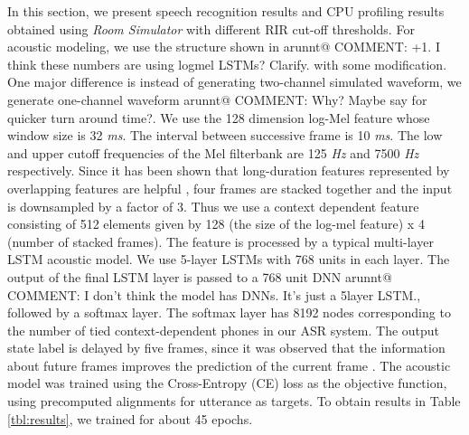 \documentclass{article}
\makeatletter
\newcommand{\AR}[1]{{\color{red} arunnt@ COMMENT: #1}}
\makeatother
\begin{document}
In this section, we present speech recognition results and CPU profiling
results obtained using \textit{Room Simulator} with different RIR cut-off
thresholds. For acoustic modeling, we use the structure shown in
\AR{+1. I think these numbers are using logmel LSTMs? Clarify.}
\cite{B_Li_INTERSPEECH_2017_1}
%
with some modification.
One major difference is instead of generating two-channel simulated
waveform, we generate one-channel waveform \AR{Why? Maybe say for quicker turn around time?}.
We use the 128 dimension log-Mel feature whose window
size is 32 \textit{ms}. The interval between successive frame is 10
\textit{ms}. The low and upper cutoff frequencies of the Mel filterbank
are 125 \textit{Hz} and 7500 \textit{Hz} respectively.
Since it has been shown that long-duration features represented by overlapping
features are helpful \cite{H_Sak_INTERSPEECH_2015_1}, four frames
are stacked together and the input is downsampled by a factor of 3.
Thus we use a context dependent feature consisting of 512 elements
given by 128 (the size of the log-mel feature) x 4 (number of stacked frames).
The feature is processed by a typical multi-layer LSTM acoustic model.
We use 5-layer LSTMs with 768 units in each layer.
The output of the final LSTM layer is passed to a 768
unit DNN \AR{I don't think the model has DNNs. It's just a 5layer LSTM.}, followed by a softmax layer.
The softmax layer has 8192 nodes corresponding to the number of tied
context-dependent phones in our ASR system. The output state label is delayed
by five frames, since it was observed that
the information about future frames improves the prediction of the current frame
  \cite{H_Sak_INTERSPEECH_2014_1, M_Schuster_ieee_trans_signal_processing_1997}.
%
The acoustic model was trained using the Cross-Entropy (CE) loss
as the objective function, using precomputed alignments for utterance as targets.
To obtain results in Table \ref{tbl:results}, we trained for about 45 epochs.
\end{document}
